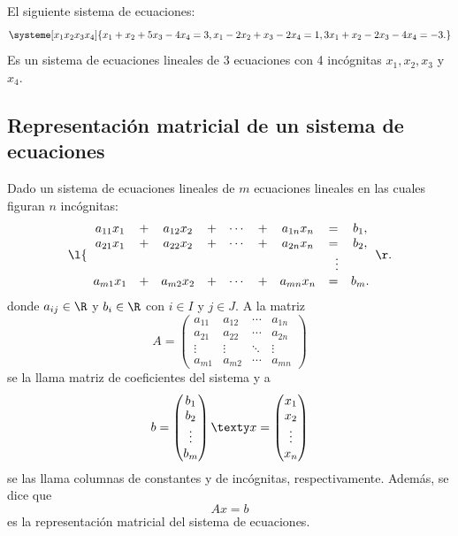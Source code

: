 \documentclass[compacto,10pt]{pubciencias-notas}
\begin{document}
\begin{ejem}
El siguiente sistema de ecuaciones:
\[
    \systeme[x_1 x_2 x_3 x_4]{x_1 +x_2 +5x_3 -4x_4=3, x_1 -2x_2 +x_3 -2x_4=1, 3x_1 +x_2 -2x_3 -4x_4=-3.}
\]
Es un sistema de ecuaciones lineales de 3 ecuaciones con 4 incógnitas $x_1, x_2, x_3$ y $x_4$. 
\end{ejem}
\subsection{Representación matricial de un sistema de ecuaciones}
\begin{defi}
Dado un sistema de ecuaciones lineales de $m$ ecuaciones lineales en las cuales figuran $n$ incógnitas:
\[
\l\{
\begin{array}{cccccccccc}
    a_{11}x_1& + &a_{12}x_2& + &\cdots &+& a_{1n}x_n &= &b_1,\\
    a_{21}x_1& + &a_{22}x_2& + &\cdots &+& a_{2n}x_n &= &b_2,\\
            &&&    &            &        & &\hspace{2mm} \vdots&\\
    a_{m1}x_1& + &a_{m2}x_2& + &\cdots &+& a_{mn}x_n &= &b_m.
\end{array}
\r.
\]
donde $a_{ij}\in\R$ y $b_i\in \R$ con $i\in I$ y $j\in J$. A la matriz
\[
    A=\begin{pmatrix}
    a_{11} & a_{12} & \cdots & a_{1n}\\
    a_{21} & a_{22} & \cdots & a_{2n}\\
    \vdots & \vdots & \ddots & \vdots\\
    a_{m1} & a_{m2} & \cdots & a_{mn}
    \end{pmatrix}
\]
se la llama matriz de coeficientes del sistema y a 
\[
    b=\begin{pmatrix}
    b_1 \\ b_2 \\ \vdots \\ b_m
    \end{pmatrix}
    \texty
    x=\begin{pmatrix}
    x_1 \\ x_2 \\ \vdots \\ x_n
    \end{pmatrix}
\]
se las llama columnas de constantes y de incógnitas, respectivamente. Además, se dice que
\[
    Ax=b
\]
es la representación matricial del sistema de ecuaciones.
\end{defi}
\end{document}

